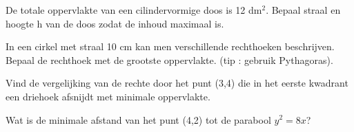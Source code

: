 \documentclass[a4paper,12pt,twoside]{article}
\begin{document}
\begin{oefening}
  De totale oppervlakte van een cilindervormige doos is 12 dm$^2$. Bepaal straal en hoogte h van de doos zodat de inhoud maximaal is.
\end{oefening}

\begin{oefening}
  In een cirkel met straal 10 cm kan men verschillende rechthoeken beschrijven. Bepaal de rechthoek met de grootste oppervlakte. (tip : gebruik Pythagoras).
\end{oefening}

\begin{oefening}
  Vind de vergelijking van de rechte door het punt (3,4) die in het eerste kwadrant een
  driehoek afsnijdt met minimale oppervlakte.
\end{oefening}

\begin{oefening}
  Wat is de minimale afstand van het punt (4,2) tot de parabool $y^2 = 8x$?
\end{oefening}


\end{document}

